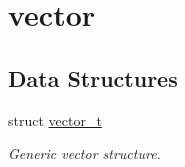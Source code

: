 \hypertarget{group__vector}{
\section{vector}
\label{group__vector}
}
\subsection*{\-Data \-Structures}
\begin{DoxyCompactItemize}
\item 
struct \hyperlink{structvector__t}{vector\-\_\-t}
\begin{DoxyCompactList}\small\item\em \-Generic vector structure. \end{DoxyCompactList}\end{DoxyCompactItemize}
